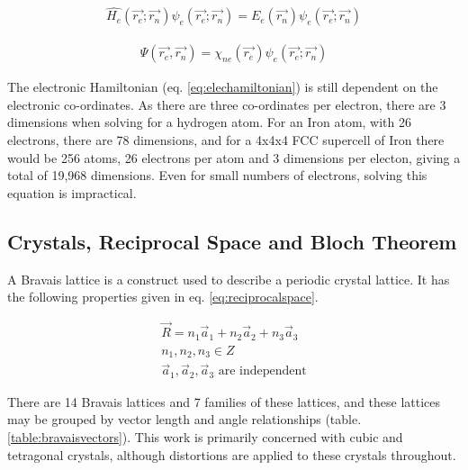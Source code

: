 \begin{equation}
\begin{split}
\hat{H_e} (\vec{r_e}; \vec{r_n}) \psi_{e} (\vec{r_e}; \vec{r_n}) = E_e (\vec{r_n})  \psi_{e} (\vec{r_e}; \vec{r_n}) 
\end{split}
\label{eq:elechamiltonian}
\end{equation}


\begin{equation}
\begin{split}
\Psi (\vec{r_e}, \vec{r_n}) = \chi_{ne} (\vec{r_e}) \psi_{e} (\vec{r_e}; \vec{r_n})
\end{split}
\label{eq:combinedwavefunction}
\end{equation}

The electronic Hamiltonian (eq. \ref{eq:elechamiltonian}) is still dependent on the electronic co-ordinates.  As there are three co-ordinates per electron, there are 3 dimensions when solving for a hydrogen atom.  For an Iron atom, with 26 electrons, there are 78 dimensions, and for a 4x4x4 FCC supercell of Iron there would be 256 atoms, 26 electrons per atom and 3 dimensions per electon, giving a total of 19,968 dimensions.  Even for small numbers of electrons, solving this equation is impractical.




\subsection{Crystals, Reciprocal Space and Bloch Theorem}
\label{section:crystalsrecipbloch}

A Bravais lattice is a construct used to describe a periodic crystal lattice.  It has the following properties given in eq. \ref{eq:reciprocalspace}. 

\begin{equation}
  \begin{split}
    \vec{R} = n_1 \vec{a}_1 + n_2 \vec{a}_2 + n_3 \vec{a}_3 \\
    n_1 , n_2, n_3 \in Z \\
    \vec{a}_1, \vec{a}_2, \vec{a}_3 \text{ are independent}
  \end{split}
  \label{eq:reciprocalspace}
\end{equation}

There are 14 Bravais lattices and 7 families of these lattices, and these lattices may be grouped by vector length and angle relationships (table. \ref{table:bravaisvectors}).  This work is primarily concerned with cubic and tetragonal crystals, although distortions are applied to these crystals throughout.


